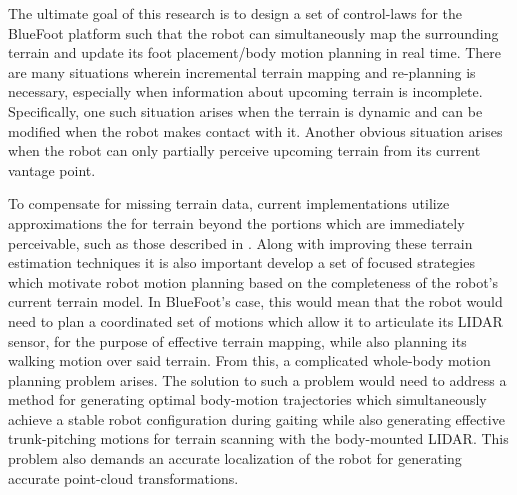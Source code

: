 	The ultimate goal of this research is to design a set of control-laws for the BlueFoot platform such that the robot can simultaneously map the surrounding terrain and update its foot placement/body motion planning in real time. There are many situations wherein incremental terrain mapping and re-planning is necessary, especially when information about upcoming terrain is incomplete. Specifically, one such situation arises when the terrain is dynamic and can be modified when the robot makes contact with it. Another obvious situation arises when the robot can only partially perceive upcoming terrain from its current vantage point.


	To compensate for missing terrain data, current implementations utilize approximations the for terrain beyond the portions which are immediately perceivable, such as those described in \cite{Kolter2009}. Along with improving these terrain estimation techniques it is also important develop a set of focused strategies which motivate robot motion planning based on the completeness of the robot's current terrain model. In BlueFoot's case, this would mean that the robot would need to plan a coordinated set of motions which allow it to articulate its LIDAR sensor, for the purpose of effective terrain mapping, while also planning its walking motion over said terrain. From this, a complicated whole-body motion planning problem arises. The solution to such a problem would need to address a method for generating optimal body-motion trajectories which simultaneously achieve a stable robot configuration during gaiting while also generating effective trunk-pitching motions for terrain scanning with the body-mounted LIDAR. This problem also demands an accurate localization of the robot for generating accurate point-cloud transformations. %


